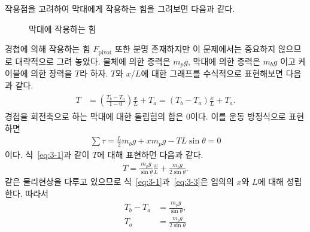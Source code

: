 \documentclass[floatfix,nofootinbib,superscriptaddress,fleqn]{revtex4-2}
\begin{document}
작용점을 고려하여 막대에게 작용하는 힘을 그려보면 다음과 같다.
\begin{figure}[htbp]
  \centering
  \caption{막대에 작용하는 힘}
\end{figure} 경첩에 의해 작용하는 힘 $F_{\mathrm{pivot}}$ 또한 분명 존재하지만 
이 문제에서는 중요하지 않으므로 대략적으로 그려 놓았다.
물체에 의한 중력은 $m_{p}g$, 막대에 의한 중력은 $m_{b}g$ 이고
케이블에 의한 장력을 $T$라 하자. $T$와 $x/L$에 대한
그래프를 수식적으로 표현해보면 다음과 같다.
\begin{align}\label{eq:3-1}
  \begin{split}
    T &= \left(\frac{T_b - T_a}{1-0}\right)\frac{x}{L}+T_a
    =\left(T_b - T_a\right)\frac{x}{L}+T_a.
  \end{split}
\end{align}
경첩을 회전축으로 하는 막대에 대한 돌림힘의 합은 0이다. 
이를 운동 방정식으로 표현하면
\begin{align}\label{eq:3-2}
  \sum \tau = \frac{L}{2}m_{b}g + xm_{p}g-TL\sin\theta=0
\end{align}
이다.
식~\eqref{eq:3-1}과 같이 $T$에 대해 표현하면 다음과 같다.
\begin{align}\label{eq:3-3}
  T = \frac{m_{p}g}{\sin\theta}\frac{x}{L}
  +\frac{m_{b}g}{2\sin\theta}.
\end{align}
같은 물리현상을 다루고 있으므로 식~\eqref{eq:3-1}과~\eqref{eq:3-3}은 
임의의 $x$와 $L$에 대해 성립한다. 따라서
\begin{align}
  \label{eq:3-3-1}T_b - T_a &= \frac{m_{p}g}{\sin\theta},  \\
  \label{eq:3-3-2}T_a &= \frac{m_{b}g}{2\sin\theta}
\end{align}
\end{document}
